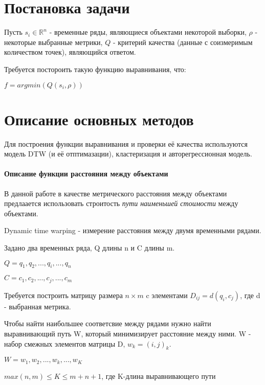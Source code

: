 \documentclass[12pt,twoside]{article}
\begin{document}
				
				
    \section{Постановка задачи}
		
				Пусть $s_i \in \mathbb{R}^n $ - временные ряды, являющиеся объектами некоторой выборки, $\rho$ - некоторые выбранные метрики, $Q$ - критерий качества (данные с соизмеримым количеством точек), являющийся ответом.
				
				Требуется постороить такую функцию выравнивания, что:
				
				$ f = argmin(Q(s_i, \rho))$
				
				\section{Описание основных методов}
				
				Для построения функции выравнивания и проверки её качества используются модель DTW (и её отптимазации), кластеризация и авторегрессионная модель.
				
				\paragraph{Описание функции расстояния между объектами}
				
				В данной работе в качестве метрического расстояния между объектами предлаается использовать строитость \textit{пути наименьшей стоимости} между объектами.
				
				Dynamic time warping - измерение расстояния между двумя временными рядами.
				
				Задано два временных ряда, Q длины n и C длины m.
				
				$Q=q_1,q_2, ..., q_i, ..., q_n $
				
				$C=c_1,c_2, ..., c_j, ..., c_m $
				
				Требуется построить матрицу размера $n\times m$ c элементами $D_{ij}=d(q_i, c_j)$, где d - выбранная метрика.
				
				Чтобы найти наибольшее соответсвие между рядами нужно найти выравнивающий путь W, который минимизирует расстояние между ними. W - набор смежных элементов матрицы D, $w_k = (i, j)_k$.
				
				$W = w_1,w_2, ..., w_k, ..., w_K $

				$max(n, m)\leq K \leq m+n+1$, где K-длина выравнивающего пути
				
\end{document}
